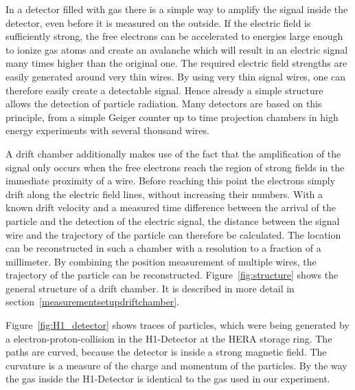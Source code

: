 \documentclass[12pt]{article}
\begin{document}
In a detector filled with gas there is a simple way to amplify the signal inside the detector, even before it is measured on the outside. If the electric field is sufficiently strong, the free electrons can be accelerated to energies large enough to ionize gas atoms and create an avalanche which will result in an electric signal many times higher than the original one. The required electric field strengths are easily generated around very thin wires. By using very thin signal wires, one can therefore easily create a detectable signal. Hence already a simple structure allows the detection of particle radiation. Many detectors are based on this principle, from a simple Geiger counter up to time projection chambers in high energy experiments with several thousand wires. 

A drift chamber additionally makes use of the fact that the amplification of the signal only occurs when the free electrons reach the region of strong fields in the immediate proximity of a wire. Before reaching this point the electrons simply drift along the electric field lines, without increasing their numbers. With a known drift velocity and a measured time difference between the arrival of the particle and the detection of the electric signal, the distance between the signal wire and the trajectory of the particle can therefore be calculated. The location can be reconstructed in such a chamber with a resolution to a fraction of a millimeter. By combining the position measurement of multiple wires, the trajectory of the particle can be reconstructed. Figure~\ref{fig:structure} shows the general structure of a drift chamber. It is described in more detail in section~\ref{measurementsetupdriftchamber}.


Figure~\ref{fig:H1_detector} shows traces of particles, which were being generated by a electron-proton-collision in the H1-Detector at the HERA storage ring. The paths are curved, because the detector is inside a strong magnetic field. The curvature is a measure of the charge and momentum of the particles. By the way the gas inside the H1-Detector is identical to the gas used in our experiment. 
\end{document}
